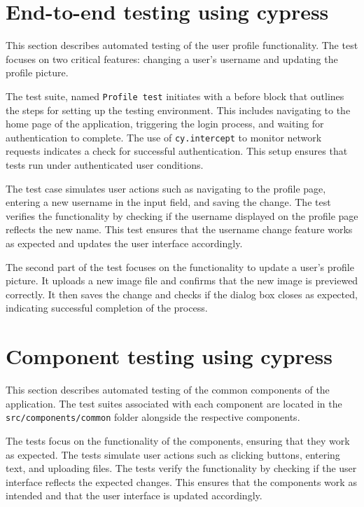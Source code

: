 \section{End-to-end testing using cypress}

This section describes automated testing of the user profile functionality. The test focuses on two critical features: changing a user's username and updating the profile picture.

The test suite, named \texttt{Profile test} initiates with a before block that outlines the steps for setting up the testing environment. This includes navigating to the home page of the application, triggering the login process, and waiting for authentication to complete. The use of \texttt{cy.intercept} to monitor network requests indicates a check for successful authentication. This setup ensures that tests run under authenticated user conditions.

The test case simulates user actions such as navigating to the profile page, entering a new username in the input field, and saving the change. The test verifies the functionality by checking if the username displayed on the profile page reflects the new name. This test ensures that the username change feature works as expected and updates the user interface accordingly.

The second part of the test focuses on the functionality to update a user's profile picture. It uploads a new image file and confirms that the new image is previewed correctly. It then saves the change and checks if the dialog box closes as expected, indicating successful completion of the process. 

\section{Component testing using cypress}

This section describes automated testing of the common components of the application. The test suites associated with each component are located in the \texttt{src/components/common} folder alongside the respective components.

The tests focus on the functionality of the components, ensuring that they work as expected. The tests simulate user actions such as clicking buttons, entering text, and uploading files. The tests verify the functionality by checking if the user interface reflects the expected changes. This ensures that the components work as intended and that the user interface is updated accordingly.

